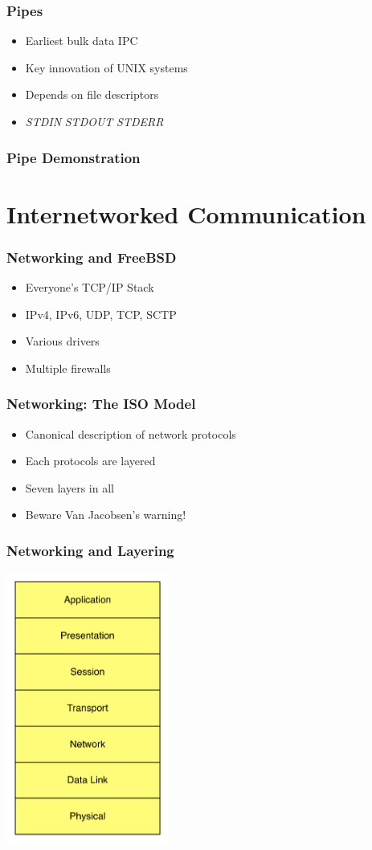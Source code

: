 \documentclass[pdftex]{beamer} %
\begin{document}
\begin{frame}[fragile]
  \frametitle{Pipes}
  \begin{itemize}
  \item Earliest bulk data IPC
  \item Key innovation of UNIX systems
  \item Depends on file descriptors
  \item \emph{STDIN} \emph{STDOUT} \emph{STDERR}
 \end{itemize}
\end{frame}

\begin{frame}
  \frametitle{Pipe Demonstration}
\end{frame}

\section{Internetworked Communication}
\label{sec:internet}

\begin{frame}
  \frametitle{Networking and FreeBSD}
  \begin{itemize}
  \item Everyone's TCP/IP Stack
  \item IPv4, IPv6, UDP, TCP, SCTP
  \item Various drivers
  \item Multiple firewalls
  \end{itemize}
\end{frame}

\begin{frame}
  \frametitle{Networking: The ISO Model}
  \begin{itemize}
  \item Canonical description of network protocols
  \item Each protocols are layered
  \item Seven layers in all
  \item Beware Van Jacobsen's warning!
  \end{itemize}
\end{frame}

\begin{frame}
  \frametitle{Networking and Layering}
\centering
\includegraphics[width=0.4\textwidth]{../../figures/ISO-layers.pdf}
\end{frame}
\end{document}
